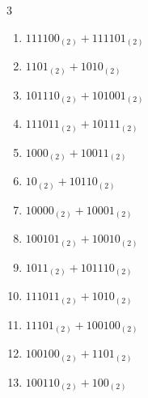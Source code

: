 \begin{multicols}{3}
\begin{enumerate}
  \item $111100_{(2)} + 111101_{(2)}$


  \item $1101_{(2)} + 1010_{(2)}$


  \item $101110_{(2)} + 101001_{(2)}$


  \item $111011_{(2)} + 10111_{(2)}$


  \item $1000_{(2)} + 10011_{(2)}$


  \item $10_{(2)} + 10110_{(2)}$


  \item $10000_{(2)} + 10001_{(2)}$


  \item $100101_{(2)} + 10010_{(2)}$


  \item $1011_{(2)} + 101110_{(2)}$


\columnbreak %

\resetques

  \item $111011_{(2)} + 1010_{(2)}$


  \item $11101_{(2)} + 100100_{(2)}$


  \item $100100_{(2)} + 1101_{(2)}$


  \item $100110_{(2)} + 100_{(2)}$



\end{enumerate}
\end{multicols}
